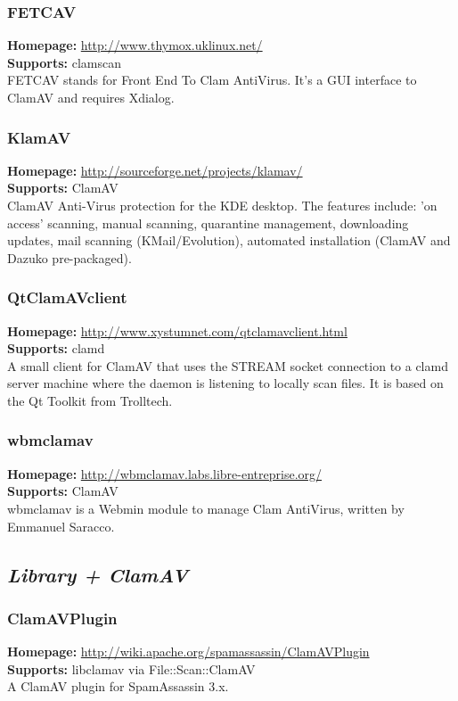 \documentclass[a4paper,titlepage,12pt]{article}
\begin{document}
    \subsubsection{FETCAV}
    \textbf{Homepage:} \url{http://www.thymox.uklinux.net/}\\
    \textbf{Supports:} clamscan\\[4pt]
    FETCAV stands for Front End To Clam AntiVirus. It's a GUI interface
    to ClamAV and requires Xdialog.

    \subsubsection{KlamAV}
    \textbf{Homepage:} \url{http://sourceforge.net/projects/klamav/}\\
    \textbf{Supports:} ClamAV\\[4pt]
    ClamAV Anti-Virus protection for the KDE desktop. The features include:
    'on access' scanning, manual scanning, quarantine management, downloading
    updates, mail scanning (KMail/Evolution), automated installation (ClamAV
    and Dazuko pre-packaged).

    \subsubsection{QtClamAVclient}
    \textbf{Homepage:} \url{http://www.xystumnet.com/qtclamavclient.html}\\
    \textbf{Supports:} clamd\\[4pt]
    A small client for ClamAV that uses the STREAM socket connection to a
    clamd server machine where the daemon is listening to locally scan files.
    It is based on the Qt Toolkit from Trolltech.

    \subsubsection{wbmclamav}
    \textbf{Homepage:} \url{http://wbmclamav.labs.libre-entreprise.org/}\\
    \textbf{Supports:} ClamAV\\[4pt]
    wbmclamav is a Webmin module to manage Clam AntiVirus, written by
    Emmanuel Saracco. 

    \subsection{\emph{Library + ClamAV}}

    \subsubsection{ClamAVPlugin}
    \textbf{Homepage:} \url{http://wiki.apache.org/spamassassin/ClamAVPlugin}\\
    \textbf{Supports:} libclamav via File::Scan::ClamAV\\[4pt]
    A ClamAV plugin for SpamAssassin 3.x.
\end{document}
